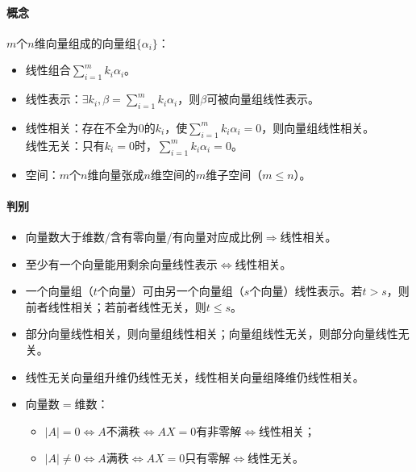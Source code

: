 \documentclass[
12pt, %
a4paper, 
oneside, %
headinclude,footinclude, %
]{scrartcl}
\begin{document}
\paragraph{概念}
$ m $个$ n $维向量组成的向量组$ \{\alpha_i\} $：
\begin{itemize}
\item 线性组合$ \sum_{i = 1}^m k_i \alpha_i $。
\item 线性表示：$ \exists k_i, \beta = \sum_{i = 1}^m k_i \alpha_i $，则$ \beta $可被向量组线性表示。
\item 
线性相关：存在不全为$ 0 $的$ k_i $，使$ \sum_{i = 1}^m k_i \alpha_i = 0 $，则向量组线性相关。 \\
线性无关：只有$ k_i = 0 $时，$ \sum_{i = 1}^m k_i \alpha_i = 0 $。
\item 空间：$ m $个$ n $维向量张成$ n $维空间的$ m $维子空间（$ m \leq n $）。
\end{itemize}
\paragraph{判别}
\begin{itemize}
\item 向量数大于维数/含有零向量/有向量对应成比例$ \Rightarrow $线性相关。
\item 至少有一个向量能用剩余向量线性表示$ \Leftrightarrow $线性相关。
\item 一个向量组（$ t $个向量）可由另一个向量组（$ s $个向量）线性表示。若$ t > s $，则前者线性相关；若前者线性无关，则$ t \leq s $。
\item 部分向量线性相关，则向量组线性相关；向量组线性无关，则部分向量线性无关。
\item 线性无关向量组升维仍线性无关，线性相关向量组降维仍线性相关。
\item 向量数$ = $维数：
\begin{itemize}
\item $ |A| = 0 $$ \Leftrightarrow $$ A $不满秩$ \Leftrightarrow $$ AX = 0 $有非零解$ \Leftrightarrow $线性相关；
\item $ |A| \neq 0 $$ \Leftrightarrow $$ A $满秩$ \Leftrightarrow $$ AX = 0 $只有零解$ \Leftrightarrow $线性无关。
\end{itemize}
\end{itemize}
\end{document}
